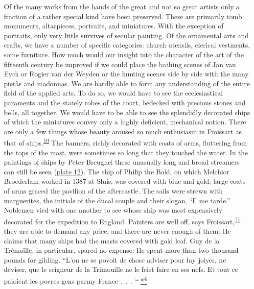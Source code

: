\protect\hypertarget{20_ILLUSTRATIONS_FOLLOW_PAGE.xhtmlux5cux23page_299}{}{}Of
the many works from the hands of the great and not so great artists only
a fraction of a rather special kind have been preserved. These are
primarily tomb monuments, altarpieces, portraits, and miniatures. With
the exception of portraits, only very little survives of secular
painting. Of the ornamental arts and crafts, we have a number of
specific categories: church utensils, clerical vestments, some
furniture. How much would our insight into the character of the art of
the fifteenth century be improved if we could place the bathing scenes
of Jan van Eyck or Rogier van der Weyden or the hunting scenes side by
side with the many pietàs and madonnas. We are hardly able to form any
understanding of the entire field of the applied arts. To do so, we
would have to see the ecclesiastical paraments and the stately robes of
the court, bedecked with precious stones and bells, all together. We
would have to be able to see the splendidly decorated ships of which the
miniatures convey only a highly deficient, mechanical notion. There are
only a few things whose beauty aroused so much enthusiasm in Froissart
as that of
ships.\textsuperscript{\protect\hypertarget{20_ILLUSTRATIONS_FOLLOW_PAGE.xhtmlux5cux23id_453}{\protect\hyperlink{23_NOTES.xhtmlux5cux23page_432}{10}}}
The banners, richly decorated with coats of arms,
\protect\hypertarget{20_ILLUSTRATIONS_FOLLOW_PAGE.xhtmlux5cux23page_300}{}{}fluttering
from the tops of the mast, were sometimes so long that they touched the
water. In the paintings of ships by Peter Breughel these unusually long
and broad streamers can still be seen
(\protect\hyperlink{20_ILLUSTRATIONS_FOLLOW_PAGE.xhtmlux5cux23id_13}{plate
12}). The ship of Philip the Bold, on which Melchior Broederlam worked
in 1387 at Sluis, was covered with blue and gold; large coats of arms
graced the pavilion of the aftercastle. The sails were strewn with
marguerites, the initials of the ducal couple and their slogan, ``Il me
tarde.'' Noblemen vied with one another to see whose ship was most
expensively decorated for the expedition to England. Painters are well
off, says
Froissart,\textsuperscript{\protect\hypertarget{20_ILLUSTRATIONS_FOLLOW_PAGE.xhtmlux5cux23id_451}{\protect\hyperlink{23_NOTES.xhtmlux5cux23id_452}{11}}}
they are able to demand any price, and there are never enough of them.
He claims that many ships had the masts covered with gold leaf. Guy de
la Trémoïlle, in particular, spared no expense: He spent more than two
thousand pounds for gilding. ``L'on ne se povoit de chose adviser pour
luy jolyer, ne deviser, que le seigneur de la Trimouille ne le feist
faire en ses nefs. Et tout ce paioient les povres gens parmy France
.~.~. ``
\protect\hypertarget{20_ILLUSTRATIONS_FOLLOW_PAGE.xhtmlux5cux23id_2661}{\protect\hyperlink{23_NOTES.xhtmlux5cux23id_2662}{*\textsuperscript{4}}}

